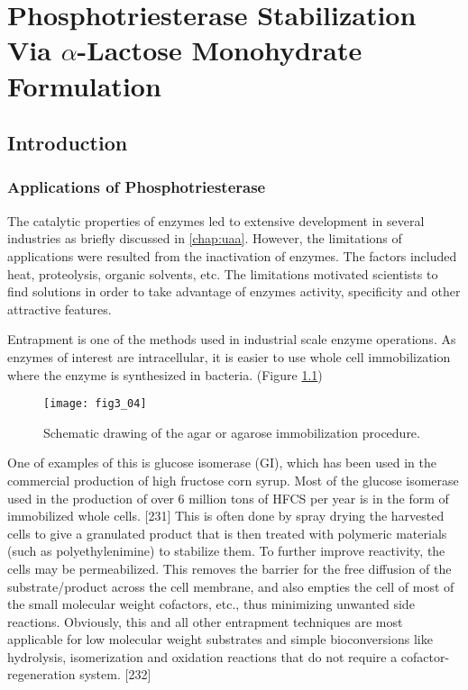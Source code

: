 \chapter{Phosphotriesterase Stabilization Via $\alpha$-Lactose Monohydrate Formulation} 
\label{chap:lactose}

\begin{refsection}

\section{Introduction}

\subsection{Applications of Phosphotriesterase}

The catalytic properties of enzymes led to extensive development in several
industries as briefly discussed in \ref{chap:uaa}. However, the limitations of
applications were resulted from the inactivation of enzymes. The factors
included heat, proteolysis, organic solvents, etc. The limitations motivated
scientists to find solutions in order to take advantage of enzymes activity,
specificity and other attractive features.

Entrapment is one of the methods used in industrial scale enzyme
operations. As enzymes of interest are intracellular, it is easier to use whole cell
immobilization where the enzyme is synthesized in bacteria. \cite{Trelles2013}
(Figure \ref{fig:enzyme-entrapment})

\begin{figure}[h!] \centering \texttt{[image: fig3\_04]}
    \caption[Schematic drawing of the agar or agarose immobilization
    procedure]{Schematic drawing of the agar or agarose immobilization
        procedure.\cite{Trelles2013}}
    \label{fig:enzyme-entrapment} 
\end{figure}

One of examples of this is glucose isomerase (GI), which has been used in the
commercial production of high fructose corn syrup.\cite{Bhosale1996} Most of
the glucose isomerase used in the production of over 6 million tons of
HFCS per year is in the form of immobilized whole cells. [231] This is often
done by spray drying the harvested cells to give a granulated product that is
then treated with polymeric materials (such as polyethylenimine) to stabilize
them. To further improve reactivity, the cells may be permeabilized.  This
removes the barrier for the free diffusion of the substrate/product across the
cell membrane, and also empties the cell of most of the small molecular weight
cofactors, etc., thus minimizing unwanted side reactions. Obviously, this and
all other entrapment techniques are most applicable for low molecular weight
substrates and simple bioconversions like hydrolysis, isomerization and
oxidation reactions that do not require a cofactor-regeneration system. [232]


\end{refsection}
